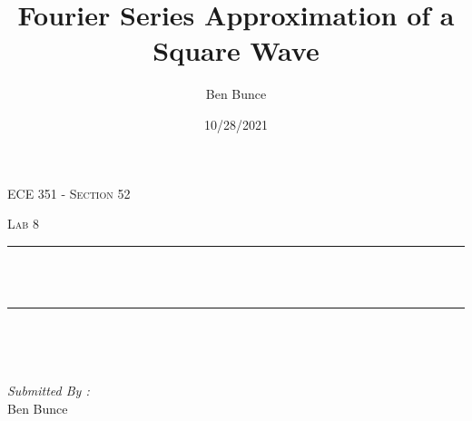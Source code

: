 \documentclass[12pt]{report}
\title{Fourier Series Approximation of a Square Wave}
\author{Ben Bunce}
\date{10/28/2021}
\makeatletter
\let\thetitle\@title
\makeatother
\begin{document}

\begin{titlepage}
	\centering
    \vspace*{0.5 cm}
\begin{center}    \textsc{\Large   ECE 351 - Section 52}\\[2.0 cm]	\end{center}%
	\textsc{\Large Lab 8  }\\[0.5 cm]				%
	\rule{\linewidth}{0.2 mm} \\[0.4 cm]
	{ \huge \bfseries \thetitle}\\
	\rule{\linewidth}{0.2 mm} \\[1.5 cm]
	
	\begin{minipage}{0.4\textwidth}
		\begin{flushleft} \large
			\end{flushleft}
			\end{minipage}~
			\begin{minipage}{0.4\textwidth}
            
			\begin{flushright} \large
			\emph{Submitted By :} \\
			Ben Bunce  
		\end{flushright}
           
	\end{minipage}\\[2 cm]
	
    
    
    
    
	
\end{titlepage}


\tableofcontents
\pagebreak

\renewcommand{\thesection}{\arabic{section}}
\end{document}
